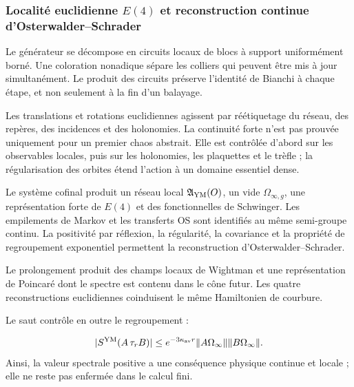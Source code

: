 \subsubsection{Localité euclidienne \(E(4)\) et reconstruction continue d’Osterwalder–Schrader}
Le générateur se décompose en circuits locaux de blocs à support uniformément borné. Une coloration nonadique sépare les colliers qui peuvent être mis à jour simultanément. Le produit des circuits préserve l’identité de Bianchi à chaque étape, et non seulement à la fin d’un balayage.\par
Les translations et rotations euclidiennes agissent par réétiquetage du réseau, des repères, des incidences et des holonomies. La continuité forte n’est pas prouvée uniquement pour un premier chaos abstrait. Elle est contrôlée d’abord sur les observables locales, puis sur les holonomies, les plaquettes et le trèfle ; la régularisation des orbites étend l’action à un domaine essentiel dense.\par
Le système cofinal produit un réseau local \(\mathfrak A_{\rm YM}(O)\), un vide \(\Omega_{\infty,g}\), une représentation forte de \(E(4)\) et des fonctionnelles de Schwinger. Les empilements de Markov et les transferts OS sont identifiés au même semi-groupe continu. La positivité par réflexion, la régularité, la covariance et la propriété de regroupement exponentiel permettent la reconstruction d’Osterwalder–Schrader.\par
Le prolongement produit des champs locaux de Wightman et une représentation de Poincaré dont le spectre est contenu dans le cône futur. Les quatre reconstructions euclidiennes coinduisent le même Hamiltonien de courbure.\par
Le saut contrôle en outre le regroupement :\par
\[
|S^{\rm YM}(A\,\tau_rB)|
\le
e^{-3\kappa_{\rm av}r}
\|A\Omega_\infty\|
\|B\Omega_\infty\|.
\]
Ainsi, la valeur spectrale positive a une conséquence physique continue et locale ; elle ne reste pas enfermée dans le calcul fini.\par
{}
